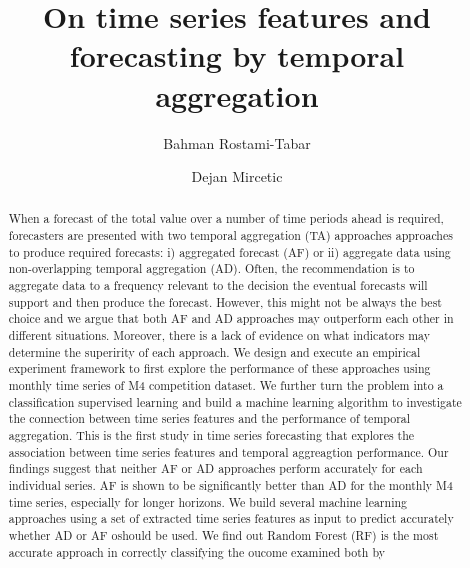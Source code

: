 \documentclass[preprint, 3p,
authoryear]{elsarticle} %
\begin{document}
\begin{frontmatter}

  \title{On time series features and forecasting by temporal
aggregation}
    \author[Cardiff Business School]{Bahman Rostami-Tabar%
  }
    \author[The Institute for Artificial Intelligence of Serbia]{Dejan
Mircetic%
  }
  
  \begin{abstract}
  When a forecast of the total value over a number of time periods ahead
  is required, forecasters are presented with two temporal aggregation
  (TA) approaches approaches to produce required forecasts: i)
  aggregated forecast (AF) or ii) aggregate data using non-overlapping
  temporal aggregation (AD). Often, the recommendation is to aggregate
  data to a frequency relevant to the decision the eventual forecasts
  will support and then produce the forecast. However, this might not be
  always the best choice and we argue that both AF and AD approaches may
  outperform each other in different situations. Moreover, there is a
  lack of evidence on what indicators may determine the superirity of
  each approach. We design and execute an empirical experiment framework
  to first explore the performance of these approaches using monthly
  time series of M4 competition dataset. We further turn the problem
  into a classification supervised learning and build a machine learning
  algorithm to investigate the connection between time series features
  and the performance of temporal aggregation. This is the first study
  in time series forecasting that explores the association between time
  series features and temporal aggreagtion performance. Our findings
  suggest that neither AF or AD approaches perform accurately for each
  individual series. AF is shown to be significantly better than AD for
  the monthly M4 time series, especially for longer horizons. We build
  several machine learning approaches using a set of extracted time
  series features as input to predict accurately whether AD or AF
  oshould be used. We find out Random Forest (RF) is the most accurate
  approach in correctly classifying the oucome examined both by

\end{abstract}
\end{frontmatter}
\end{document}
